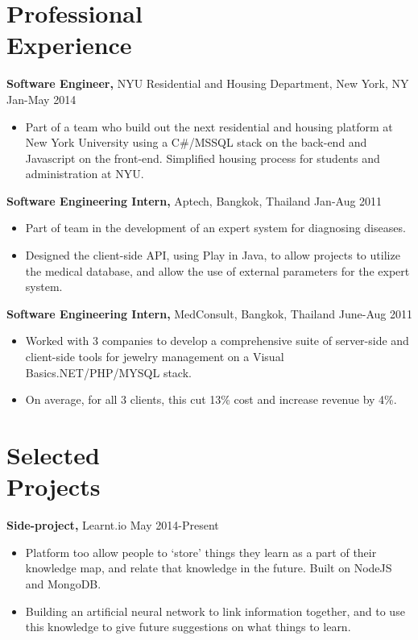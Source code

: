 \documentclass[margin]{res}
\begin{document}
 
\begin{resume}
 
\section{Professional \\ Experience}

{\bf Software Engineer,} NYU Residential and Housing Department, New York, NY \hfill Jan-May 2014
\begin{itemize} \itemsep -2pt
\item Part of a team who build out the next residential and housing platform at New York University using a C\#/MSSQL stack on the back-end and Javascript on the front-end. Simplified housing process for students and administration at NYU.
\end{itemize}

{\bf Software Engineering Intern,} Aptech, Bangkok, Thailand \hfill Jan-Aug 2011
\begin{itemize} \itemsep -2pt
\item Part of team in the development of an expert system for diagnosing diseases.
\item Designed the client-side API, using Play in Java, to allow projects to utilize the medical database, and allow the use of external parameters for the expert system.
\end{itemize}

{\bf Software Engineering Intern,} MedConsult, Bangkok, Thailand \hfill June-Aug 2011
\begin{itemize} \itemsep -2pt
\item Worked with 3 companies to develop a comprehensive suite of server-side and client-side tools for jewelry management on a Visual Basics.NET/PHP/MYSQL stack. 
\item On average, for all 3 clients, this cut 13\% cost and increase revenue by 4\%.
\end{itemize}
 
\section{Selected \\ Projects}
 
{\bf Side-project,} Learnt.io \hfill May 2014-Present
\begin{itemize} \itemsep -2pt 
\item Platform too allow people to `store' things they learn as a part of their knowledge map, and relate that knowledge in the future. Built on NodeJS and MongoDB.
\item Building an artificial neural network to link information together, and to use this knowledge to give future suggestions on what things to learn.
\end{itemize}


\end{resume}
\end{document}
